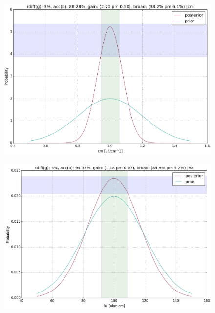 \documentclass{beamer}
\begin{document}
\begin{darkframes}
	\begin{frame}
		  \begin{columns}[T]
			\begin{column}{.5\textwidth}
				\begin{figure}
					\centering
					\includegraphics[width=\textwidth]{ramp/illustration_cm.png}
				\end{figure}
				\begin{figure}
					\centering
					\includegraphics[width=\textwidth]{ramp/illustration_Ra.png}
				\end{figure}
				

\end{column}
\end{columns}
\end{frame}
\end{darkframes}
\end{document}
